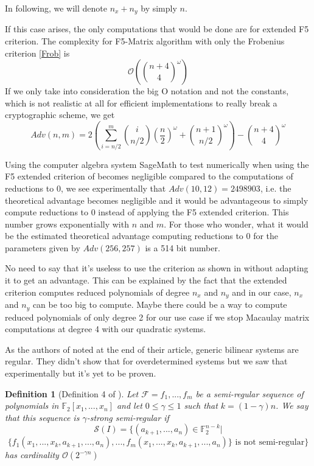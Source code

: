 \documentclass[english]{article}
\newtheorem{definition}{Definition}[section]
\begin{document}
		 In following, we will denote $n_x + n_y$ by simply $n$.
		 
		 If this case arises, the only computations that would be done are for extended F5 criterion. The complexity for F5-Matrix algorithm with only the Frobenius criterion \ref{Frob} is 
		 $$
		 \mathcal{O}\left(\binom{n + 4}{4}^\omega\right)
		 $$
		 If we only take into consideration the big O notation and not the constants, which is not realistic at all for efficient implementations to really break a cryptographic scheme, we get
		 \begin{equation}
		 Adv(n, m) = 2\left(\sum_{i = n/2}^{m}\binom{i}{n/2}\left(\frac{n}{2}\right)^\omega + \binom{n + 1}{n/2}^\omega\right) - \binom{n + 4}{4}^\omega
		 \label{equation_complex}
		 \end{equation}
		 
		 Using the computer algebra system SageMath \cite{sagemath} to test numerically when using the F5 extended criterion of \cite{FSS11} becomes negligible compared to the computations of reductions to 0, we see experimentally that $Adv(10, 12) = 2498903$, i.e. the theoretical advantage becomes negligible and it would be advantageous to simply compute reductions to 0 instead of applying the F5 extended criterion. This number grows exponentially with $n$ and $m$. For those who wonder, what it would be the estimated theoretical advantage computing reductions to 0 for the parameters given by \cite{HJ23} $Adv(256, 257)$ is a 514 bit number.
		 
		 No need to say that it's useless to use the criterion as shown in \cite{FSS11} without adapting it to get an advantage.
		 This can be explained by the fact that the extended criterion computes reduced polynomials of degree $n_x$ and $n_y$ and in our case, $n_x$ and $n_y$ can be too big to compute. Maybe there could be a way to compute reduced polynomials of only degree 2 for our use case if we stop Macaulay matrix computations at degree 4 with our quadratic systems.
		 
		 As the authors of \cite{FSS11} noted at the end of their article, generic bilinear systems are regular. They didn't show that for overdetermined systems but we saw that experimentally but it's yet to be proven.
		 
		 \begin{definition}[Definition 4 of \cite{VID24}]
		 	Let $\mathcal{F} = {f_1,...,f_m}$ be a semi-regular sequence of polynomials in $\mathbb{F}_2[x_1,...,x_n]$ and let $0 \leq \gamma \leq 1$ such that $k = (1 - \gamma)n$. We say that this sequence is $\gamma$-strong semi-regular if
		 	$$
		 	\mathcal{S}(I) = \{(a_{k+1},...,a_n) \in \mathbb{F}_{2}^{n-k} |
		 	$$
		 	$$
		 	\{f_1(x_1,...,x_k,a_{k+1},...,a_n),...,f_m(x_1,...,x_k,a_{k+1},...,a_n)\} \text{ is not semi-regular}\}
		 	$$
		 	has cardinality $\mathcal{O}(2^{-\gamma n})$
		 \end{definition}
		 
\end{document}
